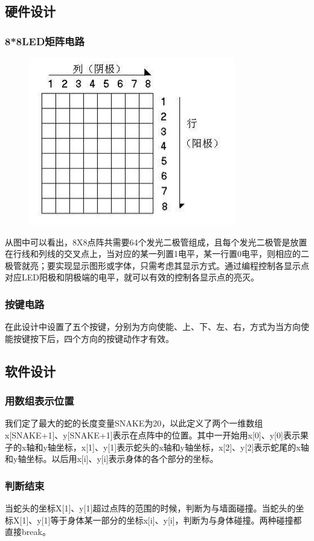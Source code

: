 \documentclass[UTF8]{ctexart}
\begin{document}
    \subsection{硬件设计}
    \subsubsection{8*8LED矩阵电路}
            \begin{figure}[ht]
	\centering
	\includegraphics[scale=0.6]{3.png}
\end{figure}
    从图中可以看出，8X8点阵共需要64个发光二极管组成，且每个发光二极管是放置在行线和列线的交叉点上，当对应的某一列置1电平，某一行置0电平，则相应的二极管就亮；要实现显示图形或字体，只需考虑其显示方式。通过编程控制各显示点对应LED阳极和阴极端的电平，就可以有效的控制各显示点的亮灭。
    \subsubsection{按键电路}
    在此设计中设置了五个按键，分别为方向使能、上、下、左、右，方式为当方向使能按键按下后，四个方向的按键动作才有效。
    \subsection{软件设计}
    \subsubsection{用数组表示位置}
    我们定了最大的蛇的长度变量SNAKE为20，以此定义了两个一维数组x[SNAKE+1]、y[SNAKE+1]表示在点阵中的位置。其中一开始用x[0]、y[0]表示果子的x轴和y轴坐标，x[1]、y[1]表示蛇头的x轴和y轴坐标，x[2]、y[2]表示蛇尾的x轴和y轴坐标。以后用x[i]、y[i]表示身体的各个部分的坐标。
    \subsubsection{判断结束}
    当蛇头的坐标X[1]、y[1]超过点阵的范围的时候，判断为与墙面碰撞。当蛇头的坐标X[1]、y[1]等于身体某一部分的坐标x[i]、y[i]，判断为与身体碰撞。两种碰撞都直接break。
\end{document}

